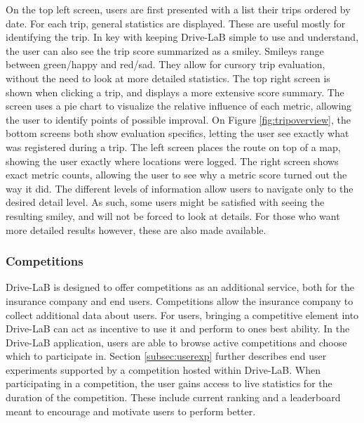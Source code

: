 On the top left screen, users are first presented with a list their trips ordered by date. For each trip, general statistics are displayed. These are useful mostly for identifying the trip. In key with keeping Drive-LaB simple to use and understand, the user can also see the trip score summarized as a smiley. Smileys range between green/happy and red/sad. They allow for cursory trip evaluation, without the need to look at more detailed statistics.
The top right screen is shown when clicking a trip, and displays a more extensive score summary. The screen uses a pie chart to visualize the relative influence of each metric, allowing the user to identify points of possible improval.
On Figure \ref{fig:tripoverview}, the bottom screens both show evaluation specifics, letting the user see exactly what was registered during a trip. The left screen places the route on top of a map, showing the user exactly where locations were logged. The right screen shows exact metric counts, allowing the user to see why a metric score turned out the way it did.
The different levels of information allow users to navigate only to the desired detail level. As such, some users might be satisfied with seeing the resulting smiley, and will not be forced to look at details. For those who want more detailed results however, these are also made available.

\subsubsection{Competitions} \label{subsubsec:competitions}
Drive-LaB is designed to offer competitions as an additional service, both for the insurance company and end users. Competitions allow the insurance company to collect additional data about users. For users, bringing a competitive element into Drive-LaB can act as incentive to use it and perform to ones best ability. In the Drive-LaB application, users are able to browse active competitions and choose which to participate in. Section \ref{subsec:userexp} further describes end user experiments supported by a competition hosted within Drive-LaB. When participating in a competition, the user gains access to live statistics for the duration of the competition. These include current ranking and a leaderboard meant to encourage and motivate users to perform better.